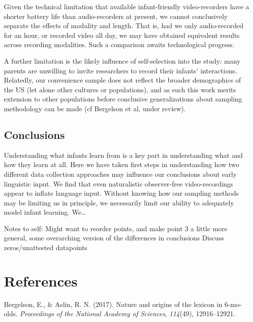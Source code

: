 \documentclass[floatsintext,man]{apa6}
\theoremstyle{definition}
\theoremstyle{definition}
\theoremstyle{definition}
\theoremstyle{remark}
\begin{document}
Given the technical limitation that available infant-friendly
video-recorders have a shorter battery life than audio-recorders at
present, we cannot conclusively separate the effects of modality and
length. That is, had we only audio-recorded for an hour, or recorded
video all day, we may have obtained equivalent results across recording
modalities. Such a comparison awaits technological progress.

A further limitation is the likely influence of self-selection into the
study: many parents are unwilling to invite researchers to record their
infants' interactions. Relatedly, our convenience sample does not
reflect the broader demographics of the US (let alone other cultures or
populations), and as such this work merits extension to other
populations before conclusive generalizations about sampling methodology
can be made (cf Bergelson et al, under review).

\subsection{Conclusions}\label{conclusions}

Understanding what infants learn from is a key part in understanding
what and how they learn at all. Here we have taken first steps in
understanding how two different data collection approaches may influence
our conclusions about early linguistic input. We find that even
naturalistic observer-free video-recordings appear to inflate language
input. Without knowing how our sampling methods may be limiting us in
principle, we necessarily limit our ability to adequately model infant
learning. We\ldots{}

Notes to self: Might want to reorder points, and make point 3 a little
more general, some overarching version of the differences in conclusions
Discuss zeros/unattested datapoints

\newpage

\section{References}\label{references}

\setlength{\parindent}{-0.5in} \setlength{\leftskip}{0.5in}

\hypertarget{refs}{}
\hypertarget{ref-bergelson2017nature}{}
Bergelson, E., \& Aslin, R. N. (2017). Nature and origins of the lexicon
in 6-mo-olds. \emph{Proceedings of the National Academy of Sciences},
\emph{114}(49), 12916--12921.
\end{document}
